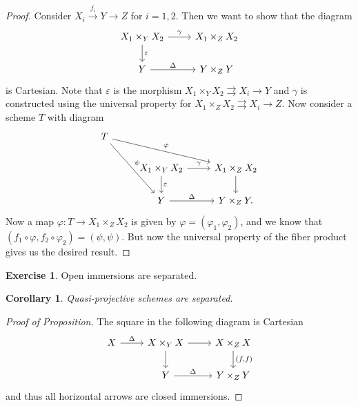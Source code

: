 \documentclass[leqno, openany]{memoir}
\newtheorem{cor}[thm]{Corollary}
\theoremstyle{definition}
\newtheorem{exer}[thm]{Exercise}
\theoremstyle{remark}
\theoremstyle{plain}
\theoremstyle{definition}
\theoremstyle{remark}
\newcommand{\ep}{\varepsilon}
\begin{document}
\begin{proof} Consider $X_i \xrightarrow{f_i} Y \to Z$ for $i = 1,2$. Then we
    want to show that the diagram \begin{equation*} \begin{tikzcd} X_1 \times_Y
        X_2 \ar{d}{\ep} \ar{r}{\gamma} & X_1 \times_Z X_2 \\ Y \ar{r}{\Delta} &
        Y \times_Z Y \end{tikzcd} \end{equation*} is Cartesian. Note that $\ep$
        is the morphism $X_1 \times_Y X_2 \rightrightarrows X_i \to Y$ and
        $\gamma$ is constructed using the universal property for $X_1 \times_Z
        X_2 \rightrightarrows X_i \to Z$. Now consider a scheme $T$ with
        diagram \begin{equation*} \begin{tikzcd} T \ar{drr}{\varphi}
        \ar{ddr}{\psi} \\ & X_1 \times_Y X_2 \ar{r}{\gamma} \ar{d}{\ep} & X_1
    \times_Z X_2 \ar{d} \\ & Y \ar{r}{\Delta} & Y \times_Z Y.  \end{tikzcd}
\end{equation*} Now a map $\varphi \colon T \to X_1 \times_Z X_2$ is given by
$\varphi = (\varphi_1, \varphi_2)$, and we know that $( f_1 \circ \varphi, f_2
\circ \varphi_2 ) = (\psi, \psi)$. But now the universal property of the fiber
product gives us the desired result.  \end{proof}

\begin{exer} Open immersions are separated.  \end{exer}

\begin{cor} Quasi-projective schemes are separated.  \end{cor}

\begin{proof}[Proof of Proposition] The square in the following diagram is
    Cartesian \begin{equation*} \begin{tikzcd} X \ar{r}{\Delta} & X \times_Y X
    \ar{d} \ar{r} & X \times_Z X \ar{d}{(f,f)} \\ & Y \ar{r}{\Delta} & Y
\times_Z Y \end{tikzcd} \end{equation*} and thus all horizontal arrows are
closed immersions.  \end{proof}
\end{document}

